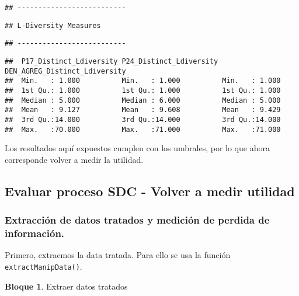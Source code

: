 \documentclass[
]{book}
\theoremstyle{definition}
\theoremstyle{definition}
\newtheorem{example}{Bloque}[chapter]
\theoremstyle{definition}
\theoremstyle{definition}
\theoremstyle{remark}
\begin{document}
\begin{verbatim}
## --------------------------
\end{verbatim}

\begin{verbatim}
## L-Diversity Measures
\end{verbatim}

\begin{verbatim}
## --------------------------
\end{verbatim}

\begin{verbatim}
##  P17_Distinct_Ldiversity P24_Distinct_Ldiversity DEN_AGREG_Distinct_Ldiversity
##  Min.   : 1.000          Min.   : 1.000          Min.   : 1.000               
##  1st Qu.: 1.000          1st Qu.: 1.000          1st Qu.: 1.000               
##  Median : 5.000          Median : 6.000          Median : 5.000               
##  Mean   : 9.127          Mean   : 9.608          Mean   : 9.429               
##  3rd Qu.:14.000          3rd Qu.:14.000          3rd Qu.:14.000               
##  Max.   :70.000          Max.   :71.000          Max.   :71.000
\end{verbatim}

Los resultados aquí expuestos cumplen con los umbrales, por lo que ahora corresponde volver a medir la utilidad.

\hypertarget{evaluar-proceso-sdc---volver-a-medir-utilidad}{%
\subsection{Evaluar proceso SDC - Volver a medir utilidad}\label{evaluar-proceso-sdc---volver-a-medir-utilidad}}

\hypertarget{extracciuxf3n-de-datos-tratados-y-mediciuxf3n-de-perdida-de-informaciuxf3n.}{%
\subsubsection{Extracción de datos tratados y medición de perdida de información.}\label{extracciuxf3n-de-datos-tratados-y-mediciuxf3n-de-perdida-de-informaciuxf3n.}}

Primero, extraemos la data tratada. Para ello se usa la función \texttt{extractManipData()}.

\begin{example}
\protect\hypertarget{exm:bloque70nbm}{}\label{exm:bloque70nbm}Extraer datos tratados
\end{example}
\end{document}
